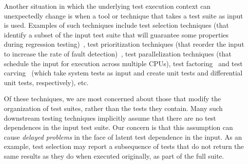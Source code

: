 

Another situation in which the underlying test execution context can
unexpectedly change is when a tool or technique that takes a test
suite as input is used.  Examples of such techniques include
test selection techniques (that identify a subset of
the input test suite that will guarantee some properties during
regression testing)~\cite{harroldetal:OOPSLA:2001}, test prioritization techniques (that reorder the
input to increase the rate of fault detection)~\cite{Elbaum:2000:PTC:347324.348910}, test parallelization
techniques (that schedule the input for execution across multiple
CPUs), test factoring~\cite{Saff:2005} and test carving~\cite{Elbaum:2006} (which take system tests as
input and create unit tests and differential unit tests,
respectively), etc. 

Of these techniques, we are most concerned about
those that modify the organization of test suites, rather than the tests
they contain.
Many such downstream testing techniques implicitly assume that
there are no test dependences in the input test suite.  Our concern is
that this assumption can cause \emph{delayed problems} in the face
of latent test dependence in the input.  As an
example, test selection may report a subsequence of tests that do not
return the same results as they do when executed originally, as part of the full suite.
%

